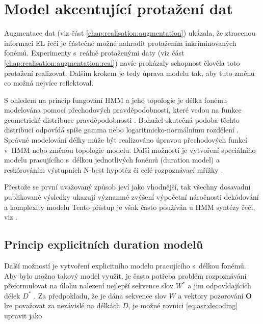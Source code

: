 \section{Model akcentující protažení dat}
\label{chap:realisation:durationmodels}

Augmentace dat (viz část \ref{chap:realisation:augmentation}) ukázala, že ztracenou informaci EL řeči je částečné možné nahradit protažením inkriminovaných fonémů.
Experimenty s~reálně protaženými daty (viz část \ref{chap:realisation:augmentation:real}) navíc prokázaly schopnost člověla toto protažení realizovat.
Dalším krokem je tedy úprava modelu tak, aby tuto změnu co možná nejvíce reflektoval.

S ohledem na princip fungování HMM a jeho topologie je délka fonému modelována pomocí přechodových pravděpodobností, které vedou na funkce geometrické distribuce pravděpodobnosti \cite{Rabiner1989}.
Bohužel skutečná podoba těchto distribucí odpovídá spíše gamma nebo logaritmicko-normálnímu rozdělení \cite{Alumae2014}.
Správné modelování délky může být realizováno úpravou přechodových funkcí v~HMM nebo změnou topologie modelu.
Další možností je vytvoření speciálního modelu pracujícího s~délkou jednotlivých fonémů (duration model) a reskórováním výstupních N-best hypotéz či celé rozpoznávací mřížky \cite{Alumae2014, Anastasakos1995, Gadde2000}.

Přestože se první uvažovaný způsob jeví jako vhodnější, tak všechny dosavadní publikované výsledky ukazují významné zvýšení výpočetní náročnosti dekódování a komplexity modelu \cite{Rabiner1989, Pylkkonen2004, Russell1985}
Tento přístup je však často používán u HMM syntézy řeči, viz \cite{Yoshimura1998}.

\subsection{Princip explicitních duration modelů}
\label{chap:realisation:durationmodels:model}

Další možností je vytvoření explicitního modelu pracujícího s~délkou fonémů. Aby bylo možno takový model využít, je často potřeba problém rozpoznávání přeformulovat na úlohu nalezení nejlepší sekvence slov $W^{*}$ a jim odpovídajících délek $D^{*}$ \cite{Alumae2014}. Za předpokladu, že je dána sekvence slov $W$ a vektory pozorování $\boldsymbol{O}$ lze považovat za nezávislé na délkách $D$, je možné rovnici \ref{eq:asr:decoding} upravit jako

